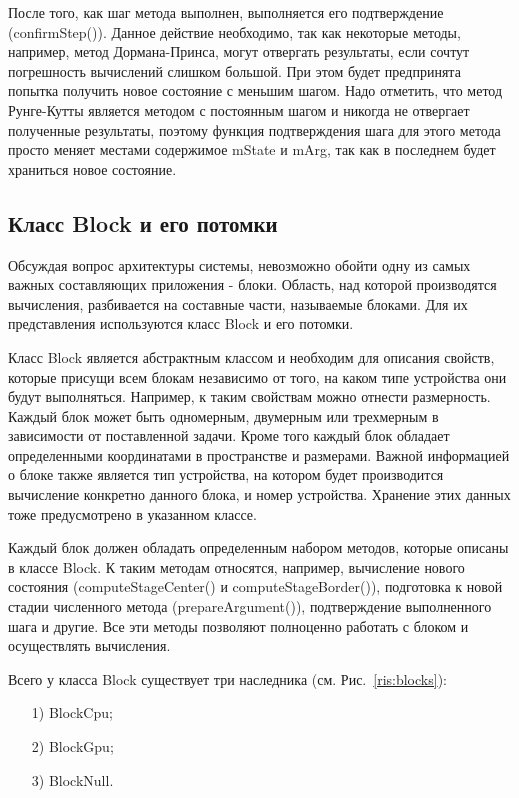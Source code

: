 \documentclass[a4paper, 14pt]{extarticle}
\theoremstyle{definition}
\begin{document}
\par После того, как шаг метода выполнен, выполняется его подтверждение (confirmStep()). Данное действие необходимо, так как некоторые методы, например, метод Дормана-Принса, могут отвергать результаты, если сочтут погрешность вычислений слишком большой. При этом будет предпринята попытка получить новое состояние с меньшим шагом. Надо отметить, что метод Рунге-Кутты является методом с постоянным шагом и никогда не отвергает полученные результаты, поэтому функция подтверждения шага для этого метода просто меняет местами содержимое mState и mArg, так как в последнем будет храниться новое состояние.



\subsection{Класс Block и его потомки}

\par Обсуждая вопрос архитектуры системы, невозможно обойти одну из самых важных составляющих приложения - блоки. Область, над которой производятся вычисления, разбивается на составные части, называемые блоками. Для их представления используются класс Block и его потомки.

\par Класс Block является абстрактным классом и необходим для описания свойств, которые присущи всем блокам независимо от того, на каком типе устройства они будут выполняться. Например, к таким свойствам можно отнести размерность. Каждый блок может быть одномерным, двумерным или трехмерным в зависимости от поставленной задачи. Кроме того каждый блок обладает определенными координатами в пространстве и размерами. Важной информацией о блоке также является тип устройства, на котором будет производится вычисление конкретно данного блока, и номер устройства. Хранение этих данных тоже предусмотрено в указанном классе.

\par Каждый блок должен обладать определенным набором методов, которые описаны в классе Block. К таким методам относятся, например, вычисление нового состояния (computeStageCenter() и computeStageBorder()), подготовка к новой стадии численного метода (prepareArgument()), подтверждение выполненного шага и другие. Все эти методы позволяют полноценно работать с блоком и осуществлять вычисления.

\par Всего у класса Block существует три наследника (см. Рис.~\ref{ris:blocks}):
\begin{enumerate}
\item[1)] BlockCpu;
\item[2)] BlockGpu;
\item[3)] BlockNull.
\end{enumerate}
\end{document}
